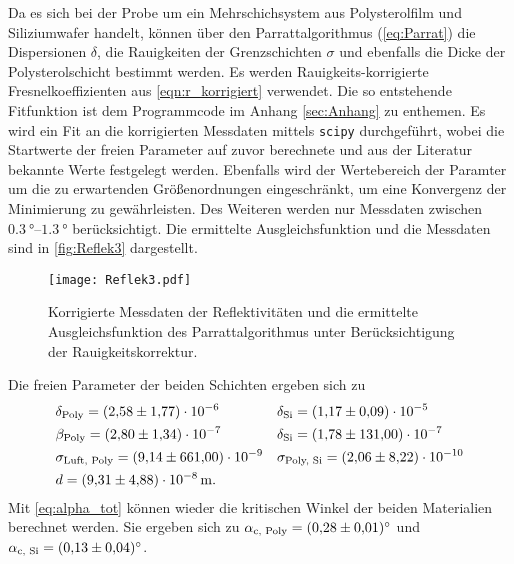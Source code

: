 Da es sich bei der Probe um ein Mehrschichsystem aus Polysterolfilm und Siliziumwafer handelt, können über den Parrattalgorithmus (\eqref{eq:Parrat})
die Dispersionen $\delta$, die Rauigkeiten der Grenzschichten $\sigma$ und ebenfalls die Dicke der Polysterolschicht bestimmt werden. 
Es werden Rauigkeits-korrigierte Fresnelkoeffizienten aus \autoref{eqn:r_korrigiert} verwendet. 
Die so entstehende Fitfunktion ist dem Programmcode im Anhang \ref{sec:Anhang} zu enthemen. Es wird ein Fit an die korrigierten Messdaten mittels \texttt{scipy} \cite{scipy}
durchgeführt, wobei die Startwerte der freien Parameter auf zuvor berechnete und aus der Literatur bekannte Werte festgelegt werden. Ebenfalls wird der Wertebereich der Paramter 
um die zu erwartenden Größenordnungen eingeschränkt, um eine Konvergenz der Minimierung zu gewährleisten. Des Weiteren werden nur Messdaten zwischen 
$\qtyrange{0.3}{1.3}{\degree}$ berücksichtigt. Die ermittelte Ausgleichsfunktion und die Messdaten sind in \autoref{fig:Reflek3} dargestellt. 
\begin{figure}
  \centering
  \texttt{[image: Reflek3.pdf]}
  \caption{Korrigierte Messdaten der Reflektivitäten und die ermittelte Ausgleichsfunktion des Parrattalgorithmus unter Berücksichtigung der Rauigkeitskorrektur.}
  \label{fig:Reflek3}
\end{figure}
Die freien Parameter der beiden Schichten ergeben sich zu 
\begin{align*}
  &\delta_\text{Poly} = \num{2.58 +- 1.77e-6} & &\delta_\text{Si} = \num{1.17 +- 0.09e-5} \\
  &\beta_\text{Poly} = \num{2.80 +- 1.34e-7} & &\delta_\text{Si} = \num{1.78 +- 131e-7} \\
  &\sigma_\text{Luft, Poly} = \num{9.14 +- 661e-9} & &\sigma_\text{Poly, Si} = \num{2.06 +- 8.22e-10} \\
  &d = \qty{9.31 +- 4.88e-8}{\metre}.
\end{align*}
Mit \autoref{eq:alpha_tot} können wieder die kritischen Winkel der beiden Materialien berechnet werden. Sie ergeben sich zu 
$\alpha_\text{c, Poly} = \qty{0.28 +- 0.01}{\degree}$ und $\alpha_\text{c, Si} = \qty{0.13 +- 0.04}{\degree}$.
